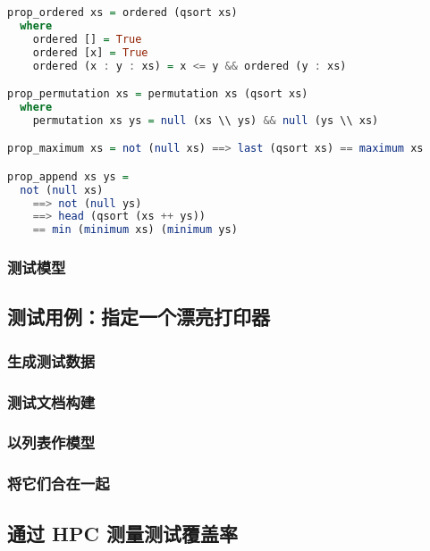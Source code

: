 \documentclass[./main.tex]{subfiles}
\begin{document}
\begin{lstlisting}[language=Haskell]
  prop_ordered xs = ordered (qsort xs)
  where
    ordered [] = True
    ordered [x] = True
    ordered (x : y : xs) = x <= y && ordered (y : xs)

prop_permutation xs = permutation xs (qsort xs)
  where
    permutation xs ys = null (xs \\ ys) && null (ys \\ xs)

prop_maximum xs = not (null xs) ==> last (qsort xs) == maximum xs

prop_append xs ys =
  not (null xs)
    ==> not (null ys)
    ==> head (qsort (xs ++ ys))
    == min (minimum xs) (minimum ys)
\end{lstlisting}


\subsubsection*{测试模型}

\subsection*{测试用例：指定一个漂亮打印器}

\subsubsection*{生成测试数据}

\subsubsection*{测试文档构建}

\subsubsection*{以列表作模型}

\subsubsection*{将它们合在一起}

\subsection*{通过 HPC 测量测试覆盖率}
\end{document}
